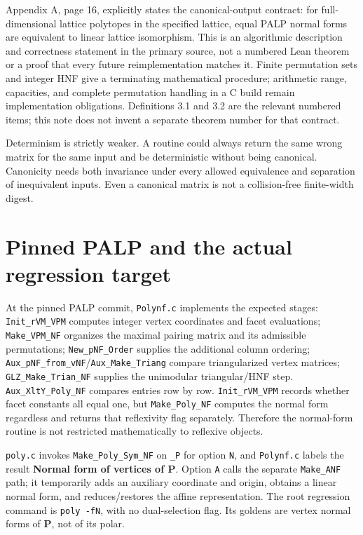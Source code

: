 \documentclass[11pt,a4paper,oneside]{report}
\begin{document}
Appendix A, page 16, explicitly states the canonical-output contract:
for full-dimensional lattice polytopes in the specified lattice, equal
PALP normal forms are equivalent to linear lattice isomorphism. This is
an algorithmic description and correctness statement in the primary
source, not a numbered Lean theorem or a proof that every future
reimplementation matches it. Finite permutation sets and integer HNF
give a terminating mathematical procedure; arithmetic range, capacities,
and complete permutation handling in a C build remain implementation
obligations. Definitions 3.1 and 3.2 are the relevant numbered items;
this note does not invent a separate theorem number for that contract.

Determinism is strictly weaker. A routine could always return the same
wrong matrix for the same input and be deterministic without being
canonical. Canonicity needs both invariance under every allowed
equivalence and separation of inequivalent inputs. Even a canonical
matrix is not a collision-free finite-width digest.

\section{Pinned PALP and the actual regression
target}\label{normal-forms-and-classification--pinned-palp-and-the-actual-regression-target}

At the pinned PALP commit, \texttt{Polynf.\allowbreak{}c} implements the
expected stages: \texttt{Init\_\allowbreak{}rVM\_\allowbreak{}VPM}
computes integer vertex coordinates and facet evaluations;
\texttt{Make\_\allowbreak{}VPM\_\allowbreak{}NF} organizes the maximal
pairing matrix and its admissible permutations;
\texttt{New\_\allowbreak{}pNF\_\allowbreak{}Order} supplies the
additional column ordering;
\texttt{Aux\_\allowbreak{}pNF\_\allowbreak{}from\_\allowbreak{}vNF}/\texttt{Aux\_\allowbreak{}Make\_\allowbreak{}Triang}
compare triangularized vertex matrices;
\texttt{GLZ\_\allowbreak{}Make\_\allowbreak{}Trian\_\allowbreak{}NF}
supplies the unimodular triangular/HNF step.
\texttt{Aux\_\allowbreak{}XltY\_\allowbreak{}Poly\_\allowbreak{}NF}
compares entries row by row.
\texttt{Init\_\allowbreak{}rVM\_\allowbreak{}VPM} records whether facet
constants all equal one, but
\texttt{Make\_\allowbreak{}Poly\_\allowbreak{}NF} computes the normal
form regardless and returns that reflexivity flag separately. Therefore
the normal-form routine is not restricted mathematically to reflexive
objects.

\texttt{poly.\allowbreak{}c} invokes
\texttt{Make\_\allowbreak{}Poly\_\allowbreak{}Sym\_\allowbreak{}NF} on
\texttt{\_\allowbreak{}P} for option \texttt{N}, and
\texttt{Polynf.\allowbreak{}c} labels the result \textbf{Normal form of
vertices of P}. Option \texttt{A} calls the separate
\texttt{Make\_\allowbreak{}ANF} path; it temporarily adds an auxiliary
coordinate and origin, obtains a linear normal form, and
reduces/restores the affine representation. The root regression command
is \texttt{poly -\allowbreak{}fN}, with no dual-selection flag. Its
goldens are vertex normal forms of \textbf{P}, not of its polar.
\end{document}
